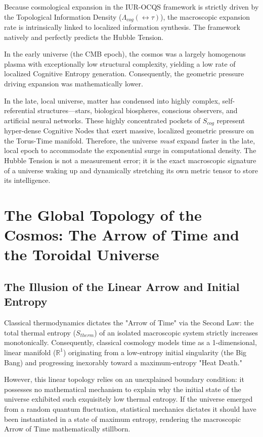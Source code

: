 \documentclass[12pt,openany]{book}
\begin{document}
Because cosmological expansion in the IUR-OCQS framework is strictly driven by the Topological Information Density ($\Lambda_{cog}(\leftrightarrow\tau)$), the macroscopic expansion rate is intrinsically linked to localized information synthesis. The framework natively and perfectly predicts the Hubble Tension.

In the early universe (the CMB epoch), the cosmos was a largely homogenous plasma with exceptionally low structural complexity, yielding a low rate of localized Cognitive Entropy generation. Consequently, the geometric pressure driving expansion was mathematically lower. 

In the late, local universe, matter has condensed into highly complex, self-referential structures---stars, biological biospheres, conscious observers, and artificial neural networks. These highly concentrated pockets of $S_{cog}$ represent hyper-dense Cognitive Nodes that exert massive, localized geometric pressure on the Torus-Time manifold. Therefore, the universe \textit{must} expand faster in the late, local epoch to accommodate the exponential surge in computational density. The Hubble Tension is not a measurement error; it is the exact macroscopic signature of a universe waking up and dynamically stretching its own metric tensor to store its intelligence.

\chapter{The Global Topology of the Cosmos: The Arrow of Time and the Toroidal Universe}

\section{The Illusion of the Linear Arrow and Initial Entropy}
Classical thermodynamics dictates the "Arrow of Time" via the Second Law: the total thermal entropy ($S_{therm}$) of an isolated macroscopic system strictly increases monotonically. Consequently, classical cosmology models time as a 1-dimensional, linear manifold ($\mathbb{R}^1$) originating from a low-entropy initial singularity (the Big Bang) and progressing inexorably toward a maximum-entropy "Heat Death."

However, this linear topology relies on an unexplained boundary condition: it possesses no mathematical mechanism to explain why the initial state of the universe exhibited such exquisitely low thermal entropy. If the universe emerged from a random quantum fluctuation, statistical mechanics dictates it should have been instantiated in a state of maximum entropy, rendering the macroscopic Arrow of Time mathematically stillborn.
\end{document}
